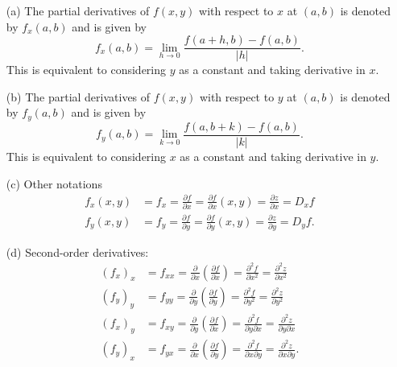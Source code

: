 \begin{definition}\quad 
    \begin{itemize}
        \item[(a)] The partial derivatives of $f(x,y)$ with respect to $x$ at $(a,b)$ is denoted by $f_x(a,b)$ and is given by
        \begin{equation*}
            f_x(a,b) = \lim_{h\to 0} \frac{f(a+h,b) - f(a,b)}{|h|}. 
        \end{equation*}
        This is equivalent to considering $y$ as a constant and taking derivative in $x$.
        \item[(b)] The partial derivatives of $f(x,y)$ with respect to $y$ at $(a,b)$ is denoted by $f_y(a,b)$ and is given by
        \begin{equation*}
            f_y(a,b) = \lim_{k\to 0} \frac{f(a,b+k) - f(a,b)}{|k|}. 
        \end{equation*}
        This is equivalent to considering $x$ as a constant and taking derivative in $y$.
        \item[(c)] Other notations
        \begin{align*}
            f_x(x,y) &= f_x = \frac{\partial f}{\partial x} = \frac{\partial f}{\partial x}(x,y) = \frac{\partial z}{\partial x} = D_xf \\
            f_y(x,y) &= f_y = \frac{\partial f}{\partial y} = \frac{\partial f}{\partial y}(x,y) = \frac{\partial z}{\partial y} = D_yf .
        \end{align*}
        \item[(d)] Second-order derivatives:
        \begin{align*}
            (f_x)_x &= f_{xx} = \frac{\partial }{\partial x}\left(\frac{\partial f}{\partial x}\right) = \frac{\partial^2 f}{\partial x^2} = \frac{\partial^2 z}{\partial x^2} \\
            (f_y)_y &= f_{yy} = \frac{\partial }{\partial y}\left(\frac{\partial f}{\partial y}\right) = \frac{\partial^2 f}{\partial y^2} = \frac{\partial^2 z}{\partial y^2} \\
            (f_x)_y &= f_{xy} = \frac{\partial }{\partial y}\left(\frac{\partial f}{\partial x}\right) = \frac{\partial^2 f}{\partial y \partial x} = \frac{\partial^2 z}{\partial y \partial x} \\
            (f_y)_x &= f_{yx} = \frac{\partial }{\partial x}\left(\frac{\partial f}{\partial y}\right) = \frac{\partial^2 f}{\partial x \partial y} = \frac{\partial^2 z}{\partial x \partial y} .
        \end{align*}

\end{itemize}
\end{definition}
